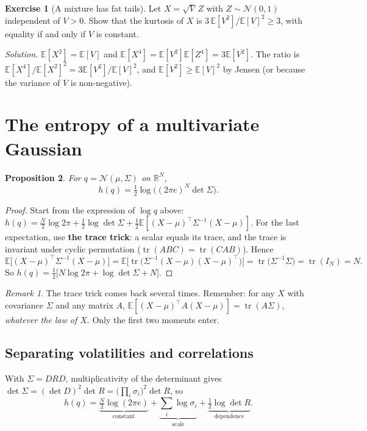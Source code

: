 \documentclass[11pt]{article}
\theoremstyle{plain}
\newtheorem{proposition}{Proposition}[section]
\theoremstyle{definition}
\newtheorem{exercice}[proposition]{Exercise}
\theoremstyle{remark}
\newtheorem*{remarque}{Remark}
\newcommand{\E}{\mathbb{E}}
\newcommand{\R}{\mathbb{R}}
\newcommand{\N}{\mathcal{N}}
\newcommand{\tr}{\operatorname{tr}}
\begin{document}
\begin{exercice}[A mixture has fat tails]
Let $X=\sqrt{V}\,Z$ with $Z\sim\N(0,1)$ independent of $V>0$. Show that the
kurtosis of $X$ is $3\,\E[V^2]/\E[V]^2\ge3$, with equality if and only if $V$
is constant.
\end{exercice}
\noindent\emph{Solution.} $\E[X^2]=\E[V]$ and $\E[X^4]=\E[V^2]\E[Z^4]=3\E[V^2]$.
The ratio is $\E[X^4]/\E[X^2]^2=3\E[V^2]/\E[V]^2$, and $\E[V^2]\ge\E[V]^2$ by
Jensen (or because the variance of $V$ is non-negative).

\section{The entropy of a multivariate Gaussian}
\label{sec:gauss}

\begin{proposition}
\label{prop:hgauss}
For $q=\N(\mu,\Sigma)$ on $\R^N$,
\[
h(q)=\tfrac12\log\bigl((2\pi e)^N\det\Sigma\bigr).
\]
\end{proposition}

\begin{proof}
Start from the expression of $\log q$ above:
$h(q)=\tfrac N2\log2\pi+\tfrac12\log\det\Sigma
+\tfrac12\E[(X-\mu)^\top\Sigma^{-1}(X-\mu)]$.
For the last expectation, use \textbf{the trace trick}: a scalar equals its
trace, and the trace is invariant under cyclic permutation
($\tr(ABC)=\tr(CAB)$). Hence
\[
\E\bigl[(X-\mu)^\top\Sigma^{-1}(X-\mu)\bigr]
=\E\bigl[\tr\bigl(\Sigma^{-1}(X-\mu)(X-\mu)^\top\bigr)\bigr]
=\tr\bigl(\Sigma^{-1}\Sigma\bigr)=\tr(I_N)=N .
\]
So $h(q)=\tfrac12\bigl[N\log2\pi+\log\det\Sigma+N\bigr]$.
\end{proof}

\begin{remarque}
The trace trick comes back several times. Remember: for any $X$ with
covariance $\Sigma$ and any matrix $A$,
$\E[(X-\mu)^\top A(X-\mu)]=\tr(A\Sigma)$, \emph{whatever the law of $X$}.
Only the first two moments enter.
\end{remarque}

\subsection{Separating volatilities and correlations}

With $\Sigma=DRD$, multiplicativity of the determinant gives
$\det\Sigma=(\det D)^2\det R=\bigl(\prod_i\sigma_i\bigr)^2\det R$, so
\begin{equation}
\label{eq:plafond}
h(q)=\underbrace{\tfrac N2\log(2\pi e)}_{\text{constant}}
+\underbrace{\sum_i\log\sigma_i}_{\text{scale}}
+\underbrace{\tfrac12\log\det R}_{\text{dependence}} .
\end{equation}
\end{document}
